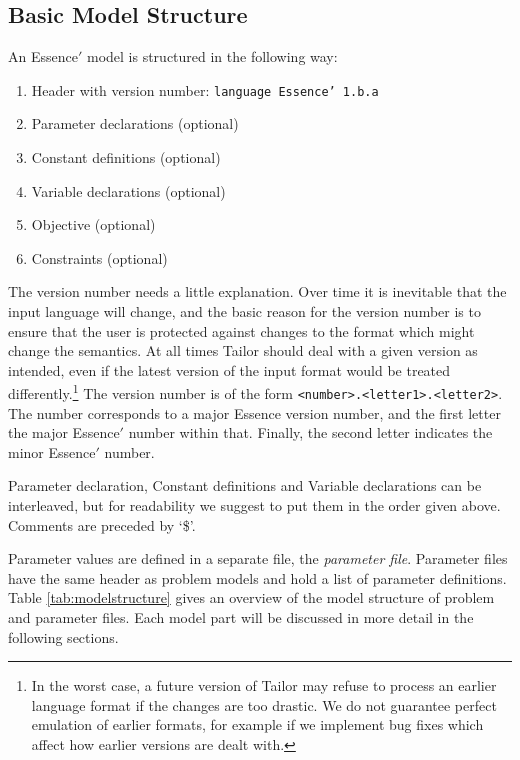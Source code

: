 \documentclass{article}
\begin{document}
\subsection{Basic Model Structure}
An {\sc Essence}$'$ model is structured in the following way:

\begin{enumerate}
\item Header with version number: {\tt  language Essence' 1.b.a} 
\item Parameter declarations (optional)
\item Constant definitions (optional)
\item Variable declarations (optional)
\item Objective (optional)
\item Constraints (optional)
\end{enumerate}

The version number needs a little explanation.   Over time it is inevitable that the input language will change, and the basic reason for the version number is to ensure that the user is protected against changes to the format which might change the semantics.   At all times Tailor should deal with a given version as intended, even if the latest version of the input format would be treated differently.\footnote{In the worst case, a future version of Tailor may refuse to process an earlier language format if the changes are too drastic. We do not guarantee perfect emulation of earlier formats, for example if we implement bug fixes which affect how earlier versions are dealt with.}  
The version number is of the form \verb|<number>.<letter1>.<letter2>|.  The number corresponds to a major {\sc Essence} version number, and the first letter the major {\sc Essence}$'$ number within that.
Finally, the second letter indicates the minor {\sc Essence}$'$ number.

Parameter declaration, Constant definitions and Variable 
declarations can be interleaved, but for readability we suggest to put them in the 
order given above. Comments are preceded by `\$'.

Parameter values are defined in a separate file, the 
{\em parameter file}. Parameter files have the same header 
as problem models and hold a list of parameter definitions.
Table \ref{tab:modelstructure} gives an overview of the model
structure of problem and parameter files.
Each model part will be discussed in more detail in the following sections.
\end{document}
